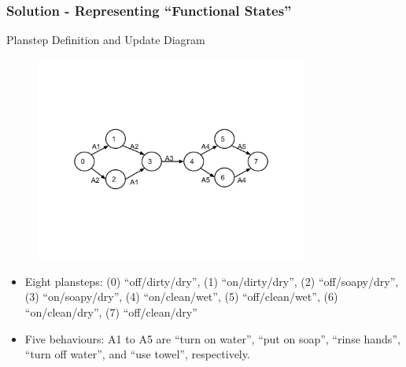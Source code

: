 \documentclass{beamer}
\begin{document}
\begin{frame}
\frametitle{Solution - Representing ``Functional States''}
Planstep Definition and Update Diagram
\begin{figure}[htp]
\centering
\includegraphics[trim = 20mm 50mm 20mm 50mm, clip, width=0.8\textwidth]{fig/fig-planstep.pdf}
\label{fig:planstep}
\end{figure}
\begin{itemize}
\item Eight plansteps: (0) ``off/dirty/dry'', (1) ``on/dirty/dry'', (2) ``off/soapy/dry'', (3) ``on/soapy/dry'', (4) ``on/clean/wet'', (5) ``off/clean/wet'', (6) ``on/clean/dry'', (7) ``off/clean/dry''
\item Five behaviours: A1 to A5 are ``turn on water'', ``put on soap'', ``rinse hands'', ``turn off water'', and ``use towel'', respectively.
\end{itemize}
\end{frame}
\end{document}
